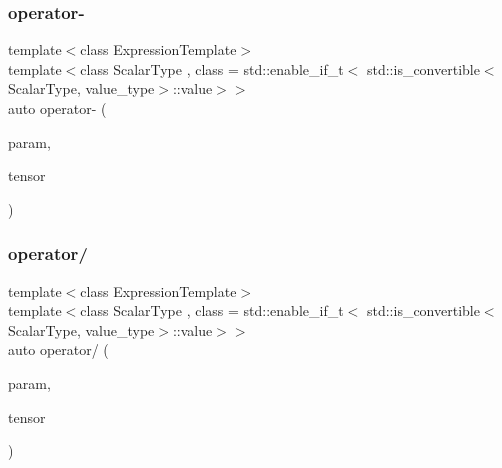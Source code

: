 \mbox{\label{classbc_1_1tensors_1_1Expression__Base_a0b24e407f0e9159f71948e51590e13ee}} 
\subsubsection{\texorpdfstring{operator-\/}{operator-}}
{\footnotesize\ttfamily template$<$class Expression\+Template$>$ \\
template$<$class Scalar\+Type , class  = std\+::enable\+\_\+if\+\_\+t$<$   std\+::is\+\_\+convertible$<$\+Scalar\+Type, value\+\_\+type$>$\+::value$>$$>$ \\
auto operator-\/ (\begin{DoxyParamCaption}\item[{const Scalar\+Type \&}]{param,  }\item[{const \hyperlink{classbc_1_1tensors_1_1Expression__Base}{Expression\+\_\+\+Base}$<$ Expression\+Template $>$ \&}]{tensor }\end{DoxyParamCaption})\hspace{0.3cm}{\ttfamily [friend]}}

\mbox{\label{classbc_1_1tensors_1_1Expression__Base_af8670bbeb905e7727156970ec95604df}} 
\subsubsection{\texorpdfstring{operator/}{operator/}}
{\footnotesize\ttfamily template$<$class Expression\+Template$>$ \\
template$<$class Scalar\+Type , class  = std\+::enable\+\_\+if\+\_\+t$<$   std\+::is\+\_\+convertible$<$\+Scalar\+Type, value\+\_\+type$>$\+::value$>$$>$ \\
auto operator/ (\begin{DoxyParamCaption}\item[{const Scalar\+Type \&}]{param,  }\item[{const \hyperlink{classbc_1_1tensors_1_1Expression__Base}{Expression\+\_\+\+Base}$<$ Expression\+Template $>$ \&}]{tensor }\end{DoxyParamCaption})\hspace{0.3cm}{\ttfamily [friend]}}


